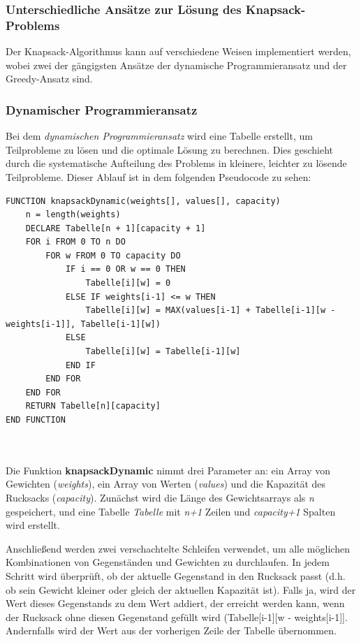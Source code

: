 \subsubsection*{Unterschiedliche Ansätze zur Lösung des Knapsack-Problems}
Der Knapsack-Algorithmus kann auf verschiedene Weisen implementiert werden, wobei zwei der gängigsten Ansätze der
dynamische Programmieransatz und der Greedy-Ansatz sind.

\subsubsection*{Dynamischer Programmieransatz}
Bei dem \textit{dynamischen Programmieransatz} wird eine Tabelle erstellt, um Teilprobleme zu lösen und die optimale
Lösung zu berechnen. Dies geschieht durch die systematische Aufteilung des Problems in kleinere, leichter zu lösende
Teilprobleme. Dieser Ablauf ist in dem folgenden Pseudocode zu sehen:
\begin{lstlisting}[style=csharp, caption={Dynamischer Algorithmus}]
FUNCTION knapsackDynamic(weights[], values[], capacity)
    n = length(weights)
    DECLARE Tabelle[n + 1][capacity + 1]
    FOR i FROM 0 TO n DO
        FOR w FROM 0 TO capacity DO
            IF i == 0 OR w == 0 THEN
                Tabelle[i][w] = 0
            ELSE IF weights[i-1] <= w THEN
                Tabelle[i][w] = MAX(values[i-1] + Tabelle[i-1][w - weights[i-1]], Tabelle[i-1][w])
            ELSE
                Tabelle[i][w] = Tabelle[i-1][w]
            END IF
        END FOR
    END FOR
    RETURN Tabelle[n][capacity]
END FUNCTION
\end{lstlisting}\\
\\
Die Funktion \textbf{knapsackDynamic} nimmt drei Parameter an: ein Array von Gewichten (\textit{weights}), ein Array von
Werten (\textit{values}) und die Kapazität des Rucksacks (\textit{capacity}). Zunächst wird die Länge des Gewichtsarrays
als \textit{n} gespeichert, und eine Tabelle \textit{Tabelle} mit \textit{n+1} Zeilen und \textit{capacity+1} Spalten wird
erstellt.

Anschließend werden zwei verschachtelte Schleifen verwendet, um alle möglichen Kombinationen von Gegenständen und Gewichten
zu durchlaufen. In jedem Schritt wird überprüft, ob der aktuelle Gegenstand in den Rucksack passt (d.h. ob sein Gewicht
kleiner oder gleich der aktuellen Kapazität ist). Falls ja, wird der Wert dieses Gegenstands zu dem Wert addiert, der
erreicht werden kann, wenn der Rucksack ohne diesen Gegenstand gefüllt wird (Tabelle[i-1][w - weights[i-1]]. Andernfalls
wird der Wert aus der vorherigen Zeile der Tabelle übernommen.

